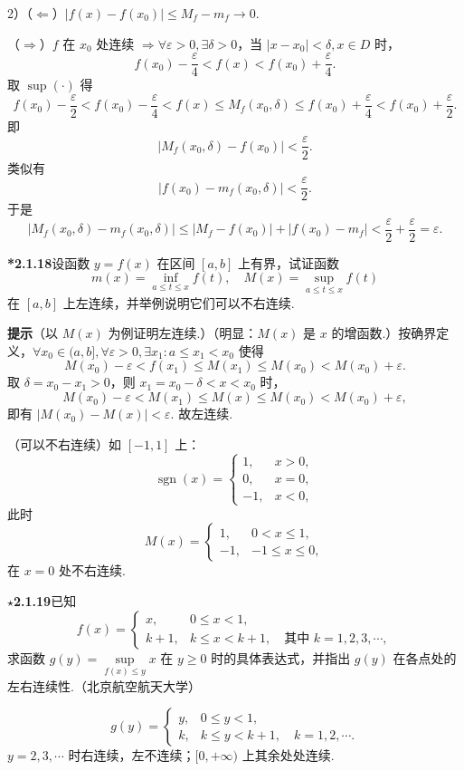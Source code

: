 \documentclass[UTF8, 12pt, fontset=fandol, oneside]{ctexart}
\begin{document}
2）（$\Leftarrow$）$|f(x)-f(x_0)|\le M_f-m_f\to0$.

（$\Rightarrow$）$f$ 在 $x_0$ 处连续 $\Rightarrow \forall\varepsilon>0,\exists\delta>0$，当 $|x-x_0|<\delta,x\in D$ 时，
\[
  f(x_0)-\frac\varepsilon4<f(x)<f(x_0)+\frac\varepsilon4.
\]
取 $\sup(\cdot)$ 得
\[
  f(x_0)-\frac\varepsilon2<f(x_0)-\frac\varepsilon4<f(x)\le M_f(x_0,\delta)
  \le f(x_0)+\frac\varepsilon4<f(x_0)+\frac\varepsilon2.
\]
即
\[
  |M_f(x_0,\delta)-f(x_0)|<\frac\varepsilon2.
\]
类似有
\[
  |f(x_0)-m_f(x_0,\delta)|<\frac\varepsilon2.
\]
于是
\[
  |M_f(x_0,\delta)-m_f(x_0,\delta)|
  \le |M_f-f(x_0)|+|f(x_0)-m_f|<\frac\varepsilon2+\frac\varepsilon2=\varepsilon.
\]

\noindent\textbf{*2.1.18}\quad 设函数 $y=f(x)$ 在区间 $[a,b]$ 上有界，试证函数
\[
  m(x)=\inf_{a\le t\le x}f(t),\quad M(x)=\sup_{a\le t\le x}f(t)
\]
在 $[a,b]$ 上左连续，并举例说明它们可以不右连续.

\noindent\textbf{提示}\quad （以 $M(x)$ 为例证明左连续.）（明显：$M(x)$ 是 $x$ 的增函数.）按确界定义，$\forall x_0\in(a,b],\forall\varepsilon>0,\exists x_1:a\le x_1<x_0$ 使得
\[
  M(x_0)-\varepsilon<f(x_1)\le M(x_1)\le M(x_0)<M(x_0)+\varepsilon.
\]
取 $\delta=x_0-x_1>0$，则 $x_1=x_0-\delta<x<x_0$ 时，
\[
  M(x_0)-\varepsilon<M(x_1)\le M(x)\le M(x_0)<M(x_0)+\varepsilon,
\]
即有 $|M(x_0)-M(x)|<\varepsilon$. 故左连续.

（可以不右连续）如 $[-1,1]$ 上：
\[
  \operatorname{sgn}(x)=
  \begin{cases}
    1, & x>0,\\
    0, & x=0,\\
    -1, & x<0,
  \end{cases}
\]
此时
\[
  M(x)=
  \begin{cases}
    1, & 0<x\le1,\\
    -1, & -1\le x\le0,
  \end{cases}
\]
在 $x=0$ 处不右连续.

\noindent\textbf{$\star$2.1.19}\quad 已知
\[
  f(x)=
  \begin{cases}
    x, & 0\le x<1,\\
    k+1, & k\le x<k+1,\quad \text{其中 }k=1,2,3,\cdots,
  \end{cases}
\]
求函数 $g(y)=\sup\limits_{f(x)\le y}x$ 在 $y\ge0$ 时的具体表达式，并指出 $g(y)$ 在各点处的左右连续性.（北京航空航天大学）

\[
  g(y)=
  \begin{cases}
    y, & 0\le y<1,\\
    k, & k\le y<k+1,\quad k=1,2,\cdots.
  \end{cases}
\]
$y=2,3,\cdots$ 时右连续，左不连续；$[0,+\infty)$ 上其余处处连续.
\end{document}
